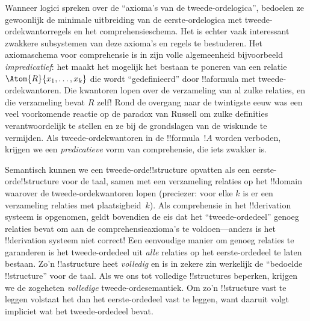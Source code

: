\documentclass[../../../include/open-logic-section]{subfiles}
\begin{document}
Wanneer logici spreken over de ``axioma's van de tweede-ordelogica'', bedoelen
ze gewoonlijk de minimale uitbreiding van de eerste-ordelogica met
tweede-ordekwantorregels en het comprehensieschema. Het is echter vaak
interessant zwakkere subsystemen van deze axioma's en regels te bestuderen.
Het axiomaschema voor comprehensie is in zijn volle algemeenheid bijvoorbeeld
\emph{impredicatief}: het maakt het mogelijk het bestaan te poneren van een
relatie $\Atom{R}{x_1, \dots, x_k}$ die wordt ``gedefinieerd'' door
!!a{formula} met tweede-ordekwantoren. Die kwantoren lopen over de verzameling
van al zulke relaties, en die verzameling bevat $R$ zelf!{} Rond de overgang
naar de twintigste eeuw was een veel voorkomende reactie op de paradox van
Russell om zulke definities verantwoordelijk te stellen en ze bij de
grondslagen van de wiskunde te vermijden. Als tweede-ordekwantoren in de
!!{formula}~$!A$ worden verboden, krijgen we een {\em predicatieve} vorm van
comprehensie, die iets zwakker is.

Semantisch kunnen we een tweede-orde!!{structure} opvatten als een
eerste-orde!!{structure} voor de taal, samen met een verzameling relaties op
het !!{domain} waarover de tweede-ordekwantoren lopen (preciezer: voor elke
$k$ is er een verzameling relaties met plaatsigheid~$k$). Als comprehensie in
het !!{derivation} systeem is opgenomen, geldt bovendien de eis dat het
``tweede-ordedeel'' genoeg relaties bevat om aan de comprehensieaxioma's te
voldoen---anders is het !!{derivation} systeem niet correct!{} Een eenvoudige
manier om genoeg relaties te garanderen is het tweede-ordedeel uit
\emph{alle} relaties op het eerste-ordedeel te laten bestaan. Zo'n
!!a{structure} heet \emph{volledig} en is in zekere zin werkelijk de
``bedoelde !!{structure}'' voor de taal. Als we ons tot volledige
!!{structure}s beperken, krijgen we de zogeheten \emph{volledige}
tweede-ordesemantiek. Om zo'n !!{structure} vast te leggen volstaat het dan
het eerste-ordedeel vast te leggen, want daaruit volgt impliciet wat het
tweede-ordedeel bevat.
\end{document}
